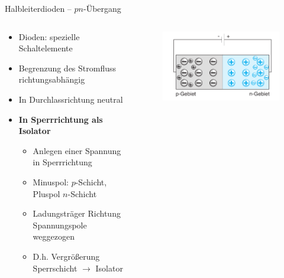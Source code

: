 \documentclass[12pt%
,aspectratio=169%
]{beamer}
\begin{document}
\begin{frame}{Halbleiterdioden -- $pn$-Übergang}
\begin{columns}[T] %
\begin{column}{.48\textwidth}
\begin{itemize}
	\item Dioden: spezielle Schaltelemente
	\item Begrenzung des Stromﬂuss richtungsabhängig
	\item In Durchlassrichtung neutral
	\item \textbf{In Sperrrichtung als Isolator}
	\begin{itemize}
		\item Anlegen einer Spannung in Sperrrichtung
		\item Minuspol: $p$-Schicht, Pluspol $n$-Schicht
		\item Ladungsträger Richtung Spannungspole weggezogen
		\item D.h. Vergrößerung Sperrschicht $\to$ Isolator
	\end{itemize}
\end{itemize}
\end{column}%
\hfill%
\begin{column}{.48\textwidth}
\begin{figure}
\center
\includegraphics[scale=0.5]{pictures/sperrrichtung}
\end{figure}
\end{column}%
\end{columns}
\end{frame}
\end{document}
